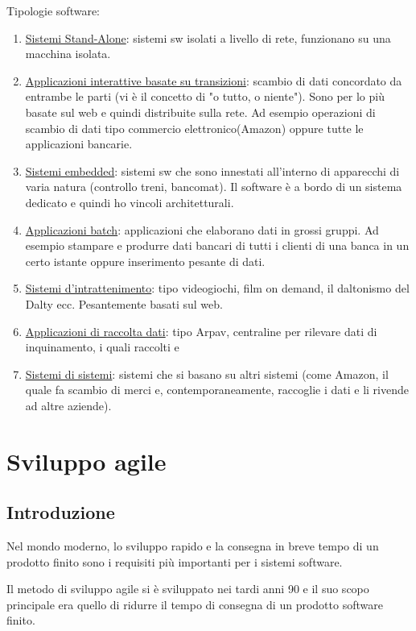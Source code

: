 \documentclass[a4paper, 10pt]{article}
\begin{document}
\begin{enumerate}
		\noindent
		Tipologie software:
		\begin{enumerate}
			\item \underline{Sistemi Stand-Alone}: sistemi sw isolati a livello di rete, funzionano su una macchina isolata.
			\item \underline{Applicazioni interattive basate su transizioni}: scambio di dati concordato
			da entrambe le parti (vi è il concetto di "o tutto, o niente"). Sono per lo
			più basate sul web e quindi distribuite sulla rete. Ad esempio operazioni di scambio di dati tipo commercio elettronico(Amazon) oppure tutte le applicazioni bancarie.
			\item \underline{Sistemi embedded}: sistemi sw che sono innestati all'interno di apparecchi di varia natura (controllo treni, bancomat). Il software è a bordo di un sistema dedicato e quindi ho vincoli architetturali. 
			\item \underline{Applicazioni batch}: applicazioni che elaborano dati in grossi gruppi. Ad esempio stampare e produrre dati bancari di tutti i clienti di una banca in un certo istante oppure inserimento pesante di dati.
			\item \underline{Sistemi d'intrattenimento}: tipo videogiochi, film on demand, il daltonismo del Dalty ecc. Pesantemente basati sul web.
			\item \underline{Applicazioni di raccolta dati}: tipo Arpav, centraline per rilevare dati di inquinamento, i quali raccolti e 
			\item \underline{Sistemi di sistemi}: sistemi che si basano su altri sistemi (come Amazon,
			il quale fa scambio di merci e, contemporaneamente, raccoglie i dati e li
			rivende ad altre aziende).
		\end{enumerate}
	\end{enumerate}
		
		\section{Sviluppo agile}
		\subsection*{Introduzione}
		Nel mondo moderno, lo sviluppo rapido e la consegna in breve tempo di un prodotto finito sono i requisiti più importanti per i sistemi software.
		
		Il metodo di sviluppo agile si è sviluppato nei tardi anni 90 e il suo scopo principale era quello di ridurre il tempo di consegna di un prodotto software finito. 
		
\end{document}
